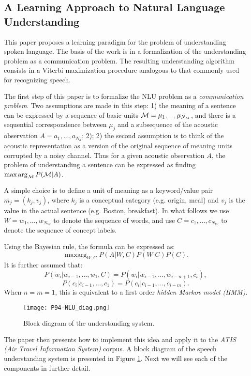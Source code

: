 \subsection{A Learning Approach to Natural Language Understanding \cite{Pieraccini1994}}

This paper proposes a learning paradigm for the problem of understanding spoken language. The basis of the work is in a formalization of the understanding problem as a communication problem. The resulting understanding algorithm consists in a Viterbi maximization procedure analogous to that commonly used for recognizing speech.

The first step of this paper is to formalize the NLU problem as a \emph{communication problem}. Two assumptions are made in this step: 1) the meaning of a sentence can be expressed by a sequence of basic units $\mathcal{M} = \mu_1, ..., \mu_{N_M}$, and there is a sequential correspondence between $\mu_j$ and a subsequence of the acoustic observation $A = a_1, ..., a_{N_a}$; 2); 2) the second assumption is to think of the acoustic representation as a version of the original sequence of meaning units corrupted by a noisy channel. Thus for a given acoustic observation $A$, the problem of understanding a sentence can be expressed as finding $\mathop{\max\arg}_{\mathcal{M}} P(\mathcal{M} | A)$.

A simple choice is to define a unit of meaning as a keyword/value pair $m_j = (k_j, v_j)$, where $k_j$ is a conceptual category (e.g. origin, meal) and $v_j$ is the value in the actual sentence (e.g. Boston, breakfast). In what follows we use $W = w_1, ..., w_{N_W}$ to denote the sequence of words, and use $C = c_1, ..., c_{N_W}$ to denote the sequence of concept labels.

Using the Bayesian rule, the formula can be expressed as:
$$\mathop{\max\arg}_{W,C} P(A | W, C) P(W | C) P(C).$$
It is further assumed that:
$$P(w_i | w_{i-1}, ..., w_1, C) = P(w_i | w_{i-1}, ..., w_{i-n+1}, c_i),$$
$$P(c_i | c_{i-1}, ..., c_1) =  P(c_i | c_{i-1}, ..., c_{i-m}).$$
When $n=m=1$, this is equivalent to a first order \emph{hidden Markov model (HMM)}.

\begin{figure}[h]
  \centering
  \texttt{[image: P94-NLU\_diag.png]}\\
  \caption{Block diagram of the understanding system.}\label{fig:P94-NLU_diag}
\end{figure}

The paper then presents how to implement this idea and apply it to the \emph{ATIS (Air Travel Information System)} corpus. A block diagram of the speech understanding system is presented in Figure \ref{fig:P94-NLU_diag}. Next we will see each of the components in further detail.

